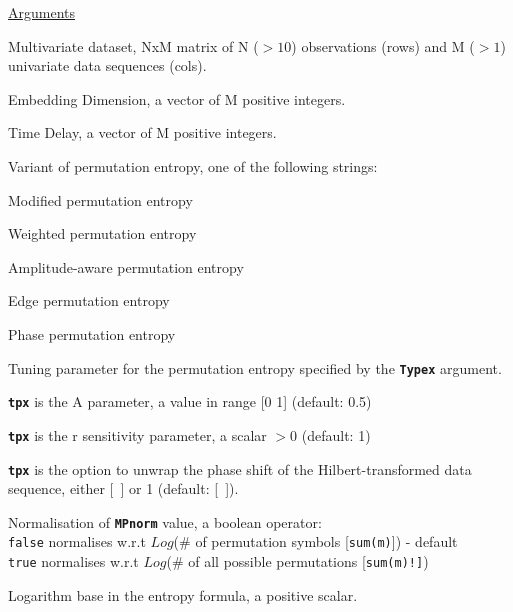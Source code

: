 \documentclass[12pt, a4paper, titlepage, openany]{book}
\begin{document}
 
\noindent \ul{Arguments}
\begin{description}[labelsep=1cm, labelwidth=2cm, nosep,,style=multiline,leftmargin=3cm]\footnotesize
\item[\texttt{Data}]	Multivariate dataset, NxM matrix of N ($>10$) observations (rows) and M ($> 1$) univariate data sequences (cols).
\item[\texttt{m}]		Embedding Dimension, a vector of M positive integers.
\item[\texttt{tau}]		Time Delay, a vector of M positive integers. 
\item[\texttt{Typex}]	Variant of permutation entropy, one of the following strings:
	\begin{description}[labelsep=10em, labelwidth=6em, nosep,style=multiline,leftmargin=3cm]
		\item[\texttt{"modified"}] 	Modified permutation entropy \cite{Perm3}
		\item[\texttt{"weighted"}]	Weighted permutation entropy \cite{Perm4}
		\item[\texttt{"ampaware"}]	Amplitude-aware permutation entropy \cite{Perm5}
		\item[\texttt{"edge"}]		Edge permutation entropy  \cite{Perm6}
		\item[\texttt{"phase"}]  Phase permutation entropy \cite{Perm9}
	\end{description}
\item[\texttt{tpx}]		Tuning parameter for the permutation entropy specified by the  \textbf{\texttt{Typex}} argument.
	\begin{description}[labelsep=10em, labelwidth=4em, nosep,style=multiline,leftmargin=3cm]	
	\item[\texttt{\emph{ampaware}}]	\textbf{\texttt{tpx}} is the A parameter, a value in range [0 1]  (default: 0.5)
	\item[\texttt{\emph{edge}}]	\textbf{\texttt{tpx}} is the r sensitivity parameter, a scalar $> 0$ (default: 1)	
	\item[\texttt{\emph{phase}}]	\textbf{\texttt{tpx}} is the option to unwrap the phase shift of the Hilbert-transformed data sequence, either [\ ] or 1 (default: [\ ]).		
	\end{description}
\item[\texttt{Norm}]    Normalisation of \texttt{\textbf{MPnorm}} value, a boolean operator:\\
					\texttt{false} \hspace{10pt} normalises w.r.t $Log$($\#$ of permutation symbols [\texttt{sum(m)}]) - default\\
     		  		\texttt{true} \hspace{15pt} normalises w.r.t $Log$($\#$ of all possible permutations [\texttt{sum(m)!]})
\item[\texttt{Logx}]	Logarithm base in the entropy formula, a positive scalar.
\end{description}
\end{document}
